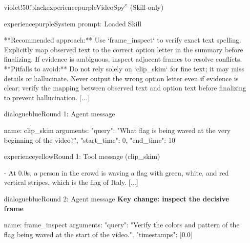 \begin{ExecutionBox}{violet!50!black}{experiencepurple}{VideoSpy$^{\mathcal{E}}$ (Skill-only)}
\raggedright
{}\par
\begin{MessageBox}{experiencepurple}{System prompt: Loaded Skill}
\begin{Trajectory}[highlightlines={2},highlightcolor=yellow!25]
[...] **Recommended approach:**
Use `frame_inspect` to verify exact text spelling. Explicitly map observed text to the correct option letter in the summary before finalizing.
If evidence is ambiguous, inspect adjacent frames to resolve conflicts.
**Pitfalls to avoid:** Do not rely solely on `clip_skim` for fine text; it may miss details or hallucinate. Never output the wrong option letter even if evidence is clear; verify the mapping between observed text and option text before finalizing to prevent hallucination. [...]
\end{Trajectory}
\end{MessageBox}
\begin{MessageBox}{dialogueblue}{Round 1: Agent message}
\begin{Trajectory}
name: clip_skim  arguments: {"query": "What flag is being waved at the very beginning of the video?", "start_time": 0, "end_time": 10}
\end{Trajectory}
\end{MessageBox}
\begin{MessageBox}{experienceyellow}{Round 1: Tool message (clip\_skim)}
\begin{Trajectory}
[...] - At 0.0s, a person in the crowd is waving a flag with green, white, and red vertical stripes, which is the flag of Italy. [...]
\end{Trajectory}
\end{MessageBox}
\begin{MessageBox}[agent message,frame hidden,borderline={1pt}{0pt}{changeaccent,dash pattern=on 3pt off 2pt},colbacktitle=red!4]{dialogueblue}{Round 2: Agent message}
\noindent\textcolor{changeaccent}{\textbf{Key change: inspect the decisive frame}}\par
\begin{Trajectory}
name: frame_inspect  arguments: {"query": "Verify the colors and pattern of the flag being waved at the start of the video.", "timestamps": [0.0]}
\end{Trajectory}
\end{MessageBox}

\end{ExecutionBox}
